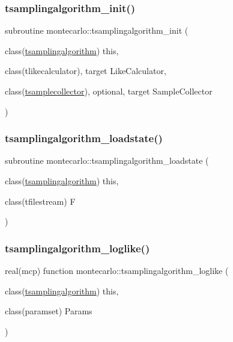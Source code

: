 \subsubsection{\texorpdfstring{tsamplingalgorithm\+\_\+init()}{tsamplingalgorithm\_init()}}
{\footnotesize\ttfamily subroutine montecarlo\+::tsamplingalgorithm\+\_\+init (\begin{DoxyParamCaption}\item[{class(\mbox{\hyperlink{structmontecarlo_1_1tsamplingalgorithm}{tsamplingalgorithm}})}]{this,  }\item[{class(tlikecalculator), target}]{Like\+Calculator,  }\item[{class(\mbox{\hyperlink{structmontecarlo_1_1tsamplecollector}{tsamplecollector}}), optional, target}]{Sample\+Collector }\end{DoxyParamCaption})\hspace{0.3cm}{\ttfamily [private]}}

\mbox{\label{namespacemontecarlo_a2c622f23ed852d71991b99be82a86450}} 
\subsubsection{\texorpdfstring{tsamplingalgorithm\+\_\+loadstate()}{tsamplingalgorithm\_loadstate()}}
{\footnotesize\ttfamily subroutine montecarlo\+::tsamplingalgorithm\+\_\+loadstate (\begin{DoxyParamCaption}\item[{class(\mbox{\hyperlink{structmontecarlo_1_1tsamplingalgorithm}{tsamplingalgorithm}})}]{this,  }\item[{class(tfilestream)}]{F }\end{DoxyParamCaption})\hspace{0.3cm}{\ttfamily [private]}}

\mbox{\label{namespacemontecarlo_a7dd4e2ca3d6d99401730978c1b3a6638}} 
\subsubsection{\texorpdfstring{tsamplingalgorithm\+\_\+loglike()}{tsamplingalgorithm\_loglike()}}
{\footnotesize\ttfamily real(mcp) function montecarlo\+::tsamplingalgorithm\+\_\+loglike (\begin{DoxyParamCaption}\item[{class(\mbox{\hyperlink{structmontecarlo_1_1tsamplingalgorithm}{tsamplingalgorithm}})}]{this,  }\item[{class(paramset)}]{Params }\end{DoxyParamCaption})\hspace{0.3cm}{\ttfamily [private]}}

